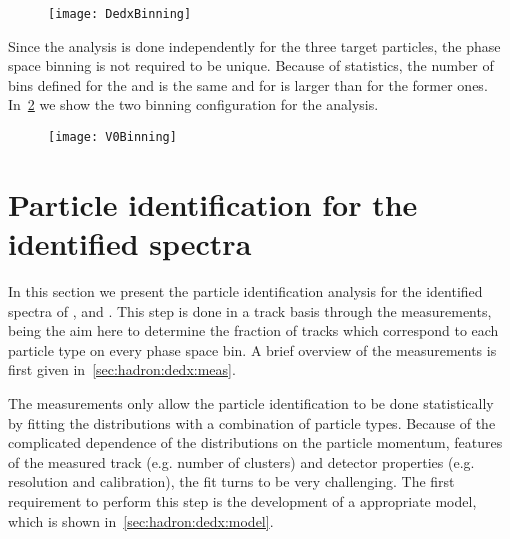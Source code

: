 \begin{figure}[!ht]
  \centering
  \texttt{[image: DedxBinning]}
  \caption{}
  \label{fig:hadron:binning:dedx}
\end{figure}

Since the \vzero analysis is done independently for the three target particles,
the phase space binning is not required to be unique. Because of statistics,
the number of bins defined for the \lamb and \antilamb is the same and
for \kzeros is larger than for the former ones.
In~\cref{fig:hadron:binning:vzero} we show the two
binning configuration for the \vzero analysis.

\begin{figure}[!ht]
  \centering
  \texttt{[image: V0Binning]}
  \caption{}
  \label{fig:hadron:binning:vzero}
\end{figure}


\section{Particle identification for the identified spectra}


In this section we present the particle identification
analysis for the identified spectra of \pions, \kaons and \protons.
This step is done in a track basis through the \dedx measurements,
being the aim here to determine the fraction of tracks which
correspond to each particle type on every phase space bin.
A brief overview of the \dedx measurements is first given
in~\cref{sec:hadron:dedx:meas}.

The \dedx measurements only allow the particle identification
to be done statistically by fitting
the \dedx distributions with a combination of particle
types. Because of the complicated dependence of the \dedx
distributions on the particle momentum,
features of the measured track (e.g. number of clusters) and
detector properties (e.g. resolution and calibration),
the \dedx fit turns to be very challenging. The first
requirement to perform this step is the development
of a appropriate \dedx model,
which is shown in~\cref{sec:hadron:dedx:model}.

